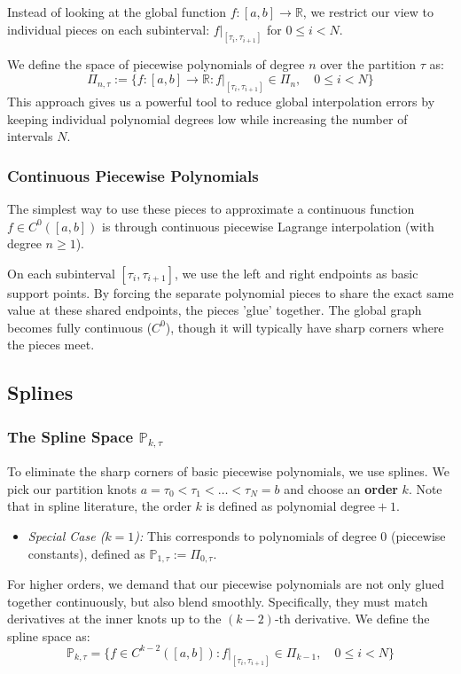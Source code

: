 \documentclass{article}
\begin{document}
Instead of looking at the global function $f: [a,b] \to \mathbb{R}$, we restrict our view to individual pieces on each subinterval: $f|_{[\tau_i,\tau_{i+1}]}$ for $0 \leq i < N$.

We define the space of piecewise polynomials of degree $n$ over the partition $\tau$ as:
\[\Pi_{n,\tau} := \{f:[a,b] \to \mathbb{R} :  f|_{[\tau_i,\tau_{i+1}]} \in \Pi_n, \quad 0 \leq i < N\}\]
This approach gives us a powerful tool to reduce global interpolation errors by keeping individual polynomial degrees low while increasing the number of intervals $N$.

\subsubsection{Continuous Piecewise Polynomials}
The simplest way to use these pieces to approximate a continuous function $f \in C^0([a,b])$ is through continuous piecewise Lagrange interpolation (with degree $n \geq 1$). 

On each subinterval $[\tau_i, \tau_{i+1}]$, we use the left and right endpoints as basic support points. By forcing the separate polynomial pieces to share the exact same value at these shared endpoints, the pieces 'glue' together. The global graph becomes fully continuous ($C^0$), though it will typically have sharp corners where the pieces meet.


\subsection{Splines}

\subsubsection{The Spline Space $\mathbb{P}_{k,\tau}$}
To eliminate the sharp corners of basic piecewise polynomials, we use splines. We pick our partition knots $a = \tau_0 < \tau_1 < \dots < \tau_N = b$ and choose an \textbf{order} $k$. Note that in spline literature, the order $k$ is defined as $\text{polynomial degree} + 1$.
\begin{itemize}
  \item \textit{Special Case ($k=1$):} This corresponds to polynomials of degree 0 (piecewise constants), defined as $\mathbb{P}_{1,\tau} := \Pi_{0,\tau}$.
\end{itemize}

For higher orders, we demand that our piecewise polynomials are not only glued together continuously, but also blend smoothly. Specifically, they must match derivatives at the inner knots up to the $(k-2)$-th derivative. We define the spline space as:
\[\mathbb{P}_{k,\tau} = \{f \in C^{k-2}([a,b]) : f |_{[\tau_i,\tau_{i+1}]} \in \Pi_{k-1}, \quad 0 \leq i < N\}\]
\end{document}

